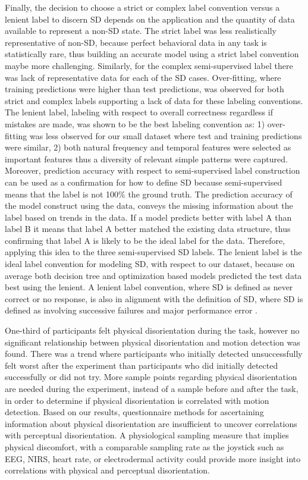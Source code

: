 \documentclass[11pt, onecolumn]{article}
\begin{document}
Finally, the decision to choose a strict or complex label convention versus a lenient label to discern SD depends on the application and the quantity of data available to represent a non-SD state.  The strict label was less realistically representative of non-SD, because perfect behavioral data in any task is statistically rare, thus building an accurate model using a strict label convention maybe more challenging. Similarly, for the complex semi-supervised label there was lack of representative data for each of the SD cases.  Over-fitting, where training predictions were higher than test predictions, was observed for both strict and complex labels supporting a lack of data for these labeling conventions.  The lenient label, labeling with respect to overall correctness regardless if mistakes are made, was shown to be the best labeling convention as: 1) over-fitting was less observed for our small dataset where test and training predictions were similar, 2) both natural frequency and temporal features were selected as important features thus a diversity of relevant simple patterns were captured.  Moreover, prediction accuracy with respect to semi-supervised label construction can be used as a confirmation for how to define SD because semi-supervised means that the label is not 100\% the ground truth.  The prediction accuracy of the model construct using the data, conveys the missing information about the label based on trends in the data. If a model predicts better with label A than label B it means that label A better matched the existing data structure, thus confirming that label A is likely to be the ideal label for the data.  Therefore, applying this idea to the three semi-supervised SD labels.  The lenient label is the ideal label convention for modeling SD, with respect to our dataset, because on average both decision tree and optimization based models predicted the test data best using the lenient.  A lenient label convention, where SD is defined as never correct or no response, is also in alignment with the definition of SD, where SD is defined as involving successive failures and major performance error \cite{Newman_2007_SD}.

One-third of participants felt physical disorientation during the task, however no significant relationship between physical disorientation and motion detection was found.  There was a trend where participants who initially detected unsuccessfully felt worst after the experiment than participants who did initially detected successfully or did not try.  More sample points regarding physical disorientation are needed during the experiment, instead of a sample before and after the task, in order to determine if physical disorientation is correlated with motion detection.  Based on our results, questionnaire methods for ascertaining information about physical disorientation are insufficient to uncover correlations with perceptual disorientation.  A physiological sampling measure that implies physical discomfort, with a comparable sampling rate as the joystick such as EEG, NIRS, heart rate, or electrodermal activity could provide more insight into correlations with physical and perceptual disorientation.
\end{document}
